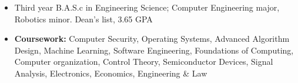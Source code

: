 \documentclass[10pt,a4paper,ragged2e,withhyper]{altacv}
\begin{document}
\tagline{}



\makecvheader



\raggedright


\begin{itemize}
  \item Third year B.A.S.c in Engineering Science; Computer Engineering major, Robotics minor. Dean's list, 3.65 GPA
  \item \textbf{Coursework:} 
    \footnotesize{
     Computer Security,                                %
     Operating Systems,                                %
     Advanced Algorithm Design, %
     Machine Learning,                                 %
     Software Engineering,                             %
     Foundations of Computing,                         %
     Computer organization,                            %
     Control Theory,                                   %
     Semiconductor Devices,                            %
     Signal Analysis,              %
     Electronics,                                       %
     Economics, Engineering \& Law
  } 
\end{itemize}
\end{document}
